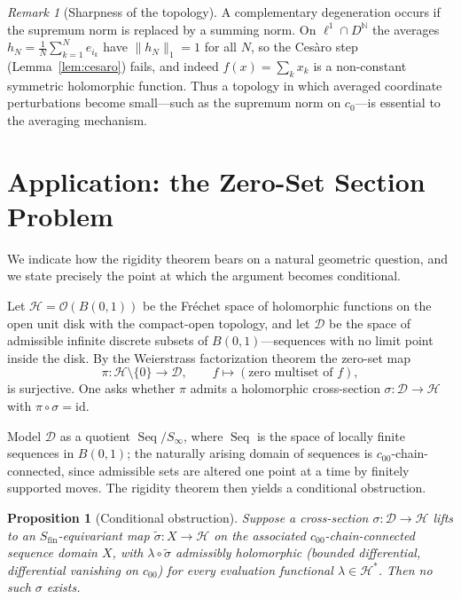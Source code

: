 \documentclass[11pt]{amsart}
\newcommand{\NN}{\mathbb{N}}
\newcommand{\cH}{\mathcal{H}}
\newcommand{\cD}{\mathcal{D}}
\newcommand{\cO}{\mathcal{O}}
\newcommand{\Sfin}{S_{\mathrm{fin}}}
\newcommand{\cc}{c_{00}}
\newcommand{\czero}{c_{0}}
\DeclareMathOperator{\Seq}{Seq}
\theoremstyle{plain}
\newtheorem{proposition}[theorem]{Proposition}
\theoremstyle{definition}
\theoremstyle{remark}
\newtheorem{remark}[theorem]{Remark}
\begin{document}
\begin{remark}[Sharpness of the topology]
\label{rem:ell1}
A complementary degeneration occurs if the supremum norm is replaced by a
summing norm. On $\ell^1\cap D^\NN$ the averages
$h_N=\tfrac1N\sum_{k=1}^N e_{i_k}$ have $\|h_N\|_1=1$ for all $N$, so the
Ces\`aro step (Lemma~\ref{lem:cesaro}) fails, and indeed $f(x)=\sum_k x_k$
is a non-constant symmetric holomorphic function. Thus a topology in which
averaged coordinate perturbations become small---such as the supremum
norm on $\czero$---is essential to the averaging mechanism.
\end{remark}

\section{Application: the Zero-Set Section Problem}
\label{sec:application}

We indicate how the rigidity theorem bears on a natural geometric question,
and we state precisely the point at which the argument becomes conditional.

Let $\cH=\cO(B(0,1))$ be the Fr\'echet space of holomorphic functions on
the open unit disk with the compact-open topology, and let $\cD$ be the
space of admissible infinite discrete subsets of $B(0,1)$---sequences with
no limit point inside the disk. By the Weierstrass factorization theorem
the zero-set map
\[
  \pi:\cH\setminus\{0\}\longrightarrow\cD, \qquad f\longmapsto
  (\text{zero multiset of }f),
\]
is surjective. One asks whether $\pi$ admits a holomorphic cross-section
$\sigma:\cD\to\cH$ with $\pi\circ\sigma=\mathrm{id}$.

Model $\cD$ as a quotient $\Seq/S_\infty$, where $\Seq$ is the space of
locally finite sequences in $B(0,1)$; the naturally arising domain of
sequences is $\cc$-chain-connected, since admissible sets are altered one
point at a time by finitely supported moves. The rigidity theorem then
yields a conditional obstruction.

\begin{proposition}[Conditional obstruction]
\label{prop:conditional}
Suppose a cross-section $\sigma:\cD\to\cH$ lifts to an
$\Sfin$-equivariant map $\widetilde\sigma:X\to\cH$ on the associated
$\cc$-chain-connected sequence domain $X$, with $\lambda\circ\widetilde
\sigma$ admissibly holomorphic (bounded differential, differential
vanishing on $\cc$) for every evaluation functional $\lambda\in\cH^*$.
Then no such $\sigma$ exists.
\end{proposition}
\end{document}
